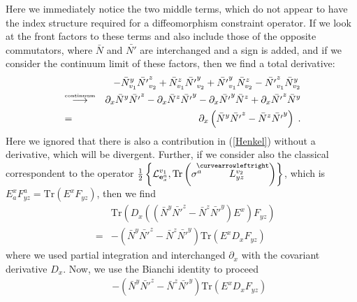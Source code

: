 \documentclass[12pt]{article}
\newcommand{\nn}{\nonumber}
\def\cl{{\cal L}}
\newcommand{\pa}{\partial}
\begin{document}
\begin{appendix}
Here we immediately notice the two middle terms, which do not appear to have the index structure required for a diffeomorphism constraint operator. If we look at the front factors to these terms and also include those of the opposite commutators, where $\bar{N}$ and $\bar{N'}$ are interchanged and a sign is added, and if we consider the continuum limit of these factors, then we find a total derivative:
\begin{eqnarray}
&&-\bar{N}_{v_1}^y   \bar{N'}_{v_2}^z +  \bar{N}_{v_1}^z  \bar{N'}_{v_2}^y 
+\bar{N'}_{v_1}^y   \bar{N}_{v_2}^z -  \bar{N'}_{v_1}^z  \bar{N}_{v_2}^y 
\nn\\
&\stackrel{\mbox{\tiny continuum}}{\longrightarrow}&
\pa_x\bar{N}^y   \bar{N'}^z -  \pa_x \bar{N}^z  \bar{N'}^y 
-\pa_x \bar{N'}^y   \bar{N}^z +\pa_x  \bar{N'}^z  \bar{N}^y 
\nn\\
&=& \pa_x \left(   \bar{N}^y  \bar{N'}^z- \bar{N}^z   \bar{N'}^y    \right)\;.
\label{Henkel}
\end{eqnarray}
Here we ignored that there is also a contribution in (\ref{Henkel}) without a derivative, which will be divergent.
Further, if we consider also the classical correspondent to the operator $\tfrac{1}{2}\left\{        \cl^{v_1}_{{\bf e}^a_x}    , \mbox{Tr} \left( \sigma^a  \stackrel{\hspace{-3mm}\curvearrowleftright}{L^{v_2}_{yz}} \right) \right\}$, which is $E^x_a F^a_{yz}=\mbox{Tr}\left( E^x F_{yz}\right)$, then we find
\begin{eqnarray}
&& \mbox{Tr} \left( D_x \left(\left( \bar{N}^y  \bar{N'}^z   - \bar{N}^z   \bar{N'}^y \right)  E^x \right) F_{yz} \right)
\nn\\
&=&-\left( \bar{N}^y  \bar{N'}^z   - \bar{N}^z   \bar{N'}^y    \right)\mbox{Tr}\left(  E^x  D_x F_{yz}     \right)
\end{eqnarray}
where we used partial integration and interchanged $\pa_x$ with the covariant derivative $D_x$. Now, we use the Bianchi identity to proceed
\begin{eqnarray}
&&-\left( \bar{N}^y  \bar{N'}^z   - \bar{N}^z   \bar{N'}^y    \right) \mbox{Tr}\left( E^x  D_x F_{yz}  \right)
\nn\\

\end{eqnarray}
\end{appendix}
\end{document}
